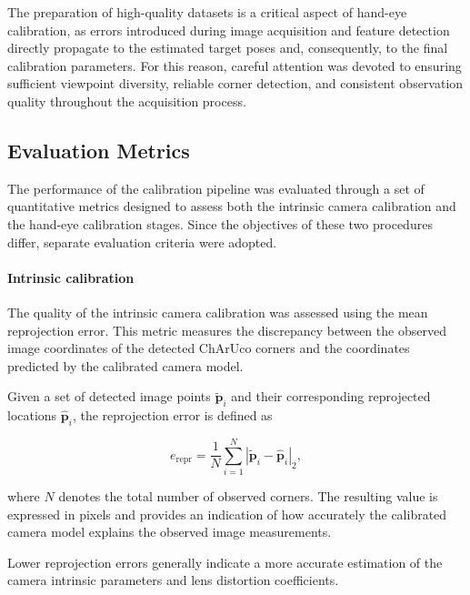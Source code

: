 The preparation of high-quality datasets is a critical aspect of hand-eye calibration, as errors introduced during image acquisition and feature detection directly propagate to the estimated target poses and, consequently, to the final calibration parameters. For this reason, careful attention was devoted to ensuring sufficient viewpoint diversity, reliable corner detection, and consistent observation quality throughout the acquisition process.






\subsection{Evaluation Metrics}
\label{subsec:evaluation_metrics}

The performance of the calibration pipeline was evaluated through a set of quantitative metrics designed to assess both the intrinsic camera calibration and the hand-eye calibration stages. Since the objectives of these two procedures differ, separate evaluation criteria were adopted.

\paragraph{Intrinsic calibration}

The quality of the intrinsic camera calibration was assessed using the mean reprojection error. This metric measures the discrepancy between the observed image coordinates of the detected ChArUco corners and the coordinates predicted by the calibrated camera model.

Given a set of detected image points $\tilde{\mathbf{p}}_i$ and their corresponding reprojected locations $\hat{\mathbf{p}}_i$, the reprojection error is defined as

\begin{equation}
	e_{\mathrm{repr}} =
	\frac{1}{N}
	\sum_{i=1}^{N}
	\left|
	\tilde{\mathbf{p}}_i -
	\hat{\mathbf{p}}_i
	\right|_2 ,
	\label{eq:mean_reprojection_error}
\end{equation}

where $N$ denotes the total number of observed corners. The resulting value is expressed in pixels and provides an indication of how accurately the calibrated camera model explains the observed image measurements.

Lower reprojection errors generally indicate a more accurate estimation of the camera intrinsic parameters and lens distortion coefficients.

